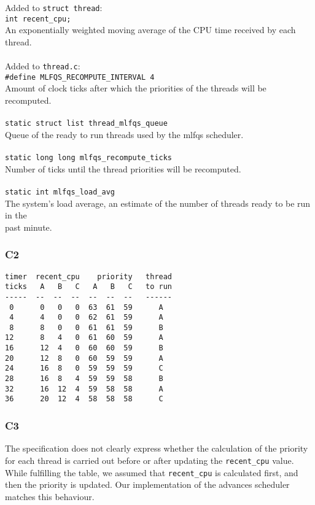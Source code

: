 \documentclass[a4wide, 11pt]{article}
\newcommand{\tab}{\hspace*{2em}}
\newcommand{\tx}{\texttt}
\begin{document}
Added to \tx{struct thread}: \\
\tab\tab \tx{int recent\_cpu;} \\
\tab\tab An exponentially weighted moving average of the CPU time received by each thread.
\\\\
Added to \tx{thread.c}: \\
\tab\tab \tx{\#define MLFQS\_RECOMPUTE\_INTERVAL 4} \\
\tab\tab Amount of clock ticks after which the priorities of the threads will be recomputed.
\\\\
\tab\tab \tx{static struct list thread\_mlfqs\_queue}\\
\tab\tab Queue of the ready to run threads used by the mlfqs scheduler.
\\\\
\tab\tab \tx{static long long mlfqs\_recompute\_ticks} \\
\tab\tab Number of ticks until the thread priorities will be recomputed.
\\\\
\tab\tab \tx{static int mlfqs\_load\_avg}\\
\tab\tab The system's load average, an estimate of the number of threads ready to be run in the \\
\tab\tab past minute.
\newpage
\subsubsection{C2}
\begin{verbatim}
timer  recent_cpu    priority   thread
ticks   A   B   C   A   B   C   to run
-----  --  --  --  --  --  --   ------
 0      0   0   0  63  61  59      A
 4      4   0   0  62  61  59      A  
 8      8   0   0  61  61  59      B
12      8   4   0  61  60  59      A
16      12  4   0  60  60  59      B
20      12  8   0  60  59  59      A     
24      16  8   0  59  59  59      C
28      16  8   4  59  59  58      B 
32      16  12  4  59  58  58      A        
36      20  12  4  58  58  58      C
\end{verbatim}

\subsubsection{C3}

The specification does not clearly express whether the calculation of the priority for each thread is carried out before or after updating the \tx{recent\_cpu} value. While fulfilling the table, we assumed that \tx{recent\_cpu} is calculated first, and then the priority is updated. Our implementation of the advances scheduler matches this behaviour.  
\end{document}
